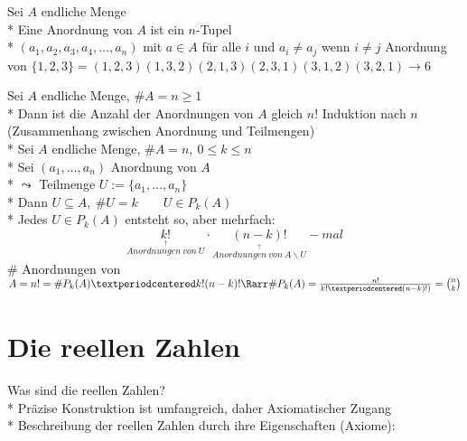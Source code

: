 Sei $A$ endliche Menge\\*
Eine Anordnung von $A$ ist ein $n$-Tupel\\*
$(a_1,a_2,a_3,a_4,…,a_n)$ mit $a\in A$ für alle $i$ und $a_i\neq a_j$ wenn $i\neq j$
%
\bsp
Anordnung von $\{1,2,3\}=(1,2,3)(1,3,2)(2,1,3)(2,3,1)(3,1,2)(3,2,1)→6$

Sei $A$ endliche Menge, $\#A=n\geq 1$\\*
Dann ist die Anzahl der Anordnungen von $A$ gleich $n!$
\bew
Induktion nach $n$
%
\bem
(Zusammenhang zwischen Anordnung und Teilmengen)\\*
Sei $A$ endliche Menge, $\#A=n,\ 0\leq k\leq n$\\*
Sei $(a_1,…,a_n)$ Anordnung von $A$\\*
$\leadsto$ Teilmenge $U:=\{a_1,…,a_n\}$\\*
Dann $U\subseteq A,\ \#U=k\qquad U\in P_k(A)$\\*
Jedes $U\in P_k(A)$ entsteht so, aber mehrfach:
$$\underset{\overset{\uparrow}{Anordnungen\ von\ U}}{k!}·\underset{\overset{\uparrow}{Anordnungen\ von\ A\backslash U}}{(n-k)!}-mal$$
$\#$ Anordnungen von $A=n!=\#P_k(A)·k!(n-k)!\Rarr\#P_k(A)=\frac{n!}{k!·(n-k)!)}=\binom{n}{k}$

\chapter{Die reellen Zahlen}
Was sind die reellen Zahlen?\\*
Präzise Konstruktion ist umfangreich, daher Axiomatischer Zugang\\*
Beschreibung der reellen Zahlen durch ihre Eigenschaften (Axiome):


